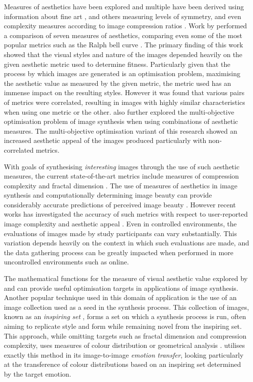 \documentclass{article}
\begin{document}
Measures of aesthetics have been explored and multiple have been derived using information about fine art \citep{ralph-bell-curve}, and others measuring levels of symmetry, and even complexity measures according to image compression ratios \citep{den2010using}.
Work by \citet{den2014investigating} performed a comparison of seven measures of aesthetics, comparing even some of the most popular metrics such as the Ralph bell curve \citep{ralph-bell-curve}.
The primary finding of this work showed that the visual styles and nature of the images depended heavily on the given aesthetic metric used to determine fitness.
Particularly given that the process by which images are generated is an optimisation problem, maximising the aesthetic value as measured by the given metric, the metric used has an immense impact on the resulting styles.
However it was found that various pairs of metrics were correlated, resulting in images with highly similar characteristics when using one metric or the other.
\citet{den2014investigating} also further explored the multi-objective optimisation problem of image synthesis when using combinations of aesthetic measures.
The multi-objective optimisation variant of this research showed an increased aesthetic appeal of the images produced particularly with non-correlated metrics.

With goals of synthesising \textit{interesting} images through the use of such aesthetic measures, the current state-of-the-art metrics include measures of compression complexity and fractal dimension \citep{johnson2019understanding}.
The use of measures of aesthetics in image synthesis and computationally determining image beauty can provide considerably accurate predictions of perceived image beauty \citep{forsythe2011predicting}.
However recent works has investigated the accuracy of such metrics with respect to user-reported image complexity and aesthetic appeal \citep{johnson2019understanding}.
Even in controlled environments, the evaluations of images made by study participants can vary substantially.
This variation depends heavily on the context in which such evaluations are made, and the data gathering process can be greatly impacted when performed in more uncontrolled environments such as online.

The mathematical functions for the measure of visual aesthetic value explored by \citet{den2014investigating} and \citet{forsythe2011predicting} can provide useful optimisation targets in applications of image synthesis.
Another popular technique used in this domain of application is the use of an image collection used as a seed in the synthesis process.
This collection of images, known as an \textit{inspiring set} \citep{johnson2019understanding}, forms a set on which a synthesis process is run, often aiming to replicate style and form while remaining novel from the inspiring set.
This approach, while omitting targets such as fractal dimension and compression complexity, uses measures of colour distribution or geometrical analysis \citep{johnson2019understanding}.
\citet{kim2018building} utilises exactly this method in its image-to-image \textit{emotion transfer}, looking particularly at the transference of colour distributions based on an inspiring set determined by the target emotion.
\end{document}
